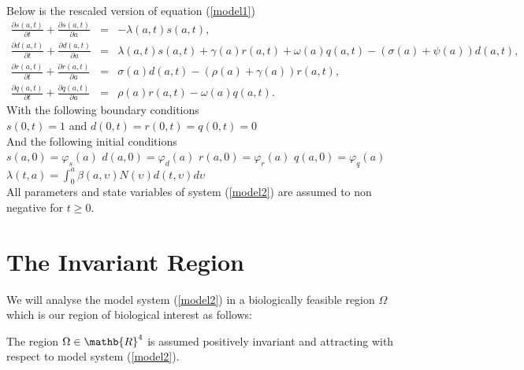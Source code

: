 Below is the rescaled version of equation (\ref{model1})
 \begin{eqnarray}\label{model2}
\frac{\partial s(a,t)}{\partial t}+ \frac{\partial s(a,t)}{\partial a} & = &  -\lambda(a,t)s(a,t),\nonumber \\
\frac{\partial
d(a,t)}{\partial t} + \frac{\partial d(a,t)}{\partial a}& = &\lambda(a,t) s(a,t)+ \gamma(a) r(a,t) + \omega(a) q(a,t)-(\sigma(a)+\psi (a)) d(a,t), \nonumber \\
\frac{\partial r(a,t)}{\partial t} + \frac{\partial r(a,t)}{\partial a} &= &\sigma(a) d(a,t)-(\rho(a) +\gamma(a) )r(a,t),  \\
\frac{\partial q(a,t)}{\partial t}+\frac{\partial q(a,t)}{\partial a} & = &\rho(a) r(a,t)-\omega(a) q(a,t)\nonumber . 
\end{eqnarray}
 With the following boundary conditions \\
 
 $s(0,t) = 1$ and  $d(0,t) = r(0,t)=q(0,t)=0$ \\
 
 And the following initial conditions \\
 
 $s(a,0)=\varphi _{s} (a)$  $d(a,0)=\varphi _{d} (a)$  $r(a,0)=\varphi _{r} (a)$
 $q(a,0)=\varphi _{q} (a)$ \\
 
 $\lambda (t,a)= \int_{0}^{a} \beta (a,\upsilon)N(\upsilon) d (t,\upsilon) d \upsilon$\\
 
 All parameters and state variables of system (\ref{model2}) are assumed to non negative for $t\geq 0$.
 
 \section{The Invariant Region}

We will analyse the model system (\ref{model2}) in a biologically feasible region $\Omega$ which is our region of biological interest as follows:

\begin{lemma}
The region $ \Omega \in \mathb{R}^4$ is assumed positively invariant and attracting with respect to model system (\ref{model2}).
\end{lemma}

